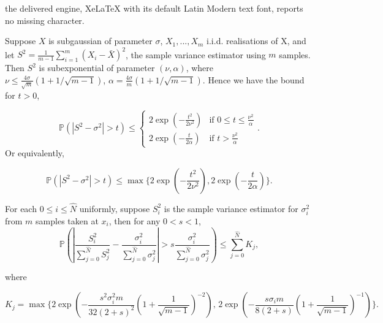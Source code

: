 \documentclass[10pt,a4paper]{amsart}
\begin{document}
the delivered engine, XeLaTeX with its default Latin Modern text font, reports no missing character.
\begin{lemma}\label{lem:sample_var_bound}
	Suppose $ X$ is subgaussian of parameter $\sigma$, $X_1, ...,X_m$ i.i.d. realisations of X, and let $S^2 = \frac{1}{m-1} \sum_{i=1}^{m} (X_i-\bar{X})^2$, the sample variance estimator using $m$ samples. Then $S^2$ is subexponential of parameter $(\nu, \alpha)$, where $\nu \leq \frac{4\sigma}{\sqrt{m}}(1+1/\sqrt{m-1})$, $\alpha = \frac{4\sigma}{m}(1+1/\sqrt{m-1})$. Hence we have the bound for $t>0$, 
	
	\[\mathbb{P}(|S^2-\sigma^2| > t) \leq \begin{cases}
		2\exp(-\frac{t^2}{2\nu^2}) & \text{if } 0\leq t\leq \frac{\nu^2}{\alpha}\\
		2\exp(-\frac{t}{2\alpha}) & \text{if } t>\frac{\nu^2}{\alpha}
	\end{cases}.\]
	Or equivalently, 
	
	\[\mathbb{P}(|S^2-\sigma^2| > t) \leq \max \{		2\exp(-\frac{t^2}{2\nu^2}),
	2\exp(-\frac{t}{2\alpha})\}	.\]
\end{lemma}

\begin{proposition}\label{cor:var_proportional_bound}
	For each $0\leq i\leq \hat{N}$ uniformly, suppose $S^2_i$ is the sample variance estimator for $\sigma^2_i$ from $m$ samples taken at $x_i$, then for any $0<s<1$, 
	\[\mathbb{P}\left(\left|\frac{S_i^2}{\sum_{j=0}^{\hat{N}}S_j^2} - \frac{\sigma_i^2}{\sum_{j=0}^{\hat{N}}\sigma_j^2}\right|>s\frac{\sigma_i^2}{\sum_{j=0}^{\hat{N}}\sigma_j^2}\right)\leq \sum_{j=0}^{\hat{N}} K_j,\]
	
	where 
	
	\[K_j = \max\{
	2\exp(-\frac{s^2\sigma_i^2 m}{32(2+s)^2}(1+\frac{1}{\sqrt{m-1}})^{-2})\text{, }
	2\exp(-\frac{s\sigma_im}{8(2+s)}(1+\frac{1}{\sqrt{m-1}})^{-1})
	\}.\]
	
	
\end{proposition}
\end{document}
